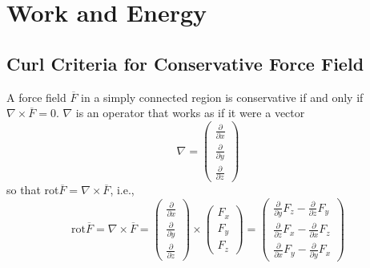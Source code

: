 \documentclass[a4paper,12pt,titlepage]{article}
\begin{document}
\section{Work and Energy}
\subsection{Curl Criteria for Conservative Force Field}
A force field $\overline F$ in a simply connected region is conservative if and only if $\nabla\times\overline F=0$.
$\nabla$ is an operator that works as if it were a vector
\[\nabla=\left(\begin{matrix}\frac{\partial}{\partial x}\\\frac{\partial}{\partial y}\\\frac{\partial}{\partial z}\end{matrix}\right)\]
so that rot$\overline F=\nabla\times \overline{F}$, i.e.,
\[\mathrm{rot}\overline{F}=\nabla\times \overline{F}=\left(\begin{matrix}\frac{\partial}{\partial x}\\\frac{\partial}{\partial y}\\\frac{\partial}{\partial z}\end{matrix}\right)\times\left(\begin{matrix}F_x\\F_y\\F_z\end{matrix}\right)=\left(\begin{matrix}\frac{\partial}{\partial y}F_z-\frac{\partial}{\partial z}F_y\\\frac{\partial}{\partial z}F_x-\frac{\partial}{\partial x}F_z\\\frac{\partial}{\partial x}F_y-\frac{\partial}{\partial y}F_x\end{matrix}\right)\]
\end{document}
